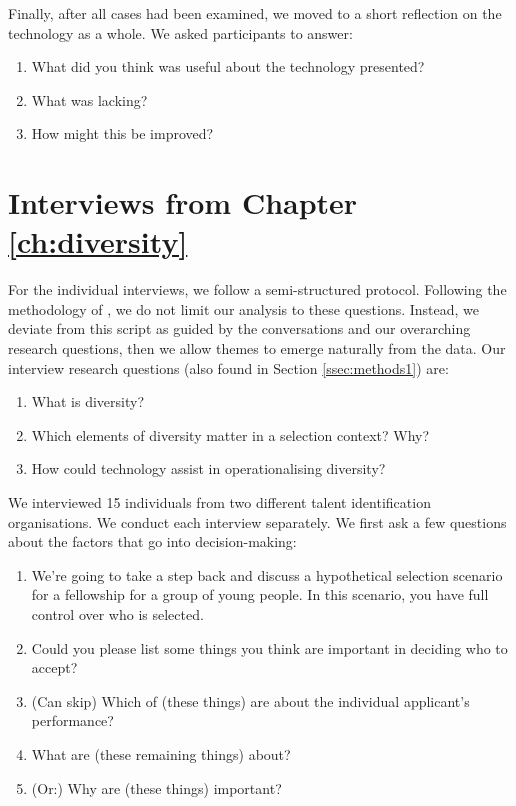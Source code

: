 Finally, after all cases had been examined, we moved to a short reflection on the technology as a whole. We asked participants to answer:

\begin{enumerate}
    \item What did you think was useful about the technology presented?
    \item What was lacking?
    \item How might this be improved?
\end{enumerate}


\section{Interviews from Chapter \ref{ch:diversity}}\label{app:divprotocol1}
For the individual interviews, we follow a semi-structured protocol. Following the methodology of \textcite{braun_using_2006}, we do not limit our analysis to these questions. Instead, we deviate from this script as guided by the conversations and our overarching research questions, then we allow themes to emerge naturally from the data. Our interview research questions (also found in Section \ref{ssec:methods1}) are:

\begin{enumerate}
    \item What is diversity?
    \item Which elements of diversity matter in a selection context? Why?
    \item How could technology assist in operationalising diversity?
\end{enumerate}

We interviewed 15 individuals from two different talent identification organisations. We conduct each interview separately. We first ask a few questions about the factors that go into decision-making:

\begin{enumerate}
    \item We're going to take a step back and discuss a hypothetical selection scenario for a fellowship for a group of young people. In this scenario, you have full control over who is selected.
    \item Could you please list some things you think are important in deciding who to accept?
    \item (Can skip) Which of (these things) are about the individual applicant's performance?
    \item What are (these remaining things) about? 
    \item (Or:) Why are (these things) important?
\end{enumerate}

